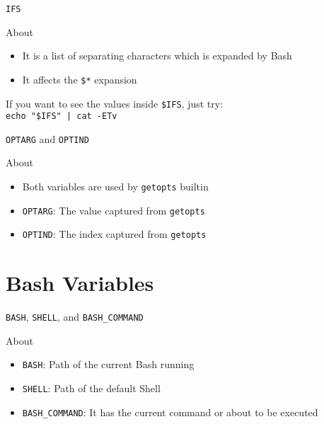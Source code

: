 \documentclass[10pt, compress, aspectratio=169]{beamer}
\begin{document}
\begin{frame}{\texttt{IFS}}
  \begin{exampleblock}{About}
    \begin{itemize}
      \item It is a list of separating characters which is expanded by Bash
      \item It affects the \texttt{\$*} expansion
    \end{itemize}
  \end{exampleblock}
  If you want to see the values inside \texttt{\$IFS}, just try: \\
  \texttt{echo "\$IFS" | cat -ETv}
\end{frame}

\begin{frame}{\texttt{OPTARG} and \texttt{OPTIND}}
  \begin{exampleblock}{About}
    \begin{itemize}
      \item Both variables are used by \texttt{getopts} builtin
      \item \texttt{OPTARG}: The value captured from \texttt{getopts}
      \item \texttt{OPTIND}: The index captured from \texttt{getopts}
    \end{itemize}
  \end{exampleblock}
\end{frame}

\section{Bash Variables}

\begin{frame}{\texttt{BASH}, \texttt{SHELL}, and \texttt{BASH\_COMMAND}}
  \begin{exampleblock}{About}
    \begin{itemize}
      \item \texttt{BASH}: Path of the current Bash running
      \item \texttt{SHELL}: Path of the default Shell
      \item \texttt{BASH\_COMMAND}: It has the current command or about to be
            executed
    \end{itemize}
  \end{exampleblock}
\end{frame}
\end{document}
